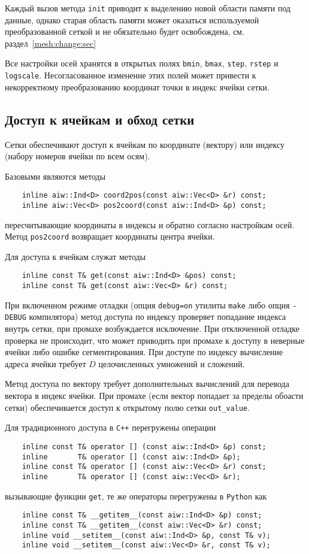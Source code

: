 Каждый вызов метода \verb'init' приводит к выделению новой области памяти под данные, однако старая область памяти
может оказаться используемой преобразованной сеткой и не обязательно будет освобождена, см. раздел~\ref{mesh:change:sec}

Все настройки осей хранятся в открытых полях \verb'bmin', \verb'bmax', \verb'step',
\verb'rstep' и \verb'logscale'. 
Несогласованное изменение этих полей может привести к некорректному преобразованию координат точки
в индекс ячейки сетки.

\subsection{Доступ к ячейкам и обход сетки}
Сетки обеспечивают доступ к ячейкам по координате (вектору) или индексу (набору номеров ячейки по всем осям).

Базовыми являются методы
\begin{verbatim}
    inline aiw::Ind<D> coord2pos(const aiw::Vec<D> &r) const;
    inline aiw::Vec<D> pos2coord(const aiw::Ind<D> &p) const;
\end{verbatim}
пересчитывающие координаты в индексы и обратно согласно настройкам осей. Метод \verb'pos2coord' возвращает координаты 
центра ячейки. 

Для доступа к ячейкам служат методы
\begin{verbatim}
    inline const T& get(const aiw::Ind<D> &pos) const;
    inline const T& get(const aiw::Vec<D> &r) const;
\end{verbatim}
При включенном режиме отладки (опция \verb'debug=on' утилиты \verb'make' либо опция \verb'-DEBUG' компилятора)
метод доступа по индексу проверяет попадание индекса внутрь сетки, при промахе возбуждается исключение.
При отключенной отладке проверка не происходит, что может приводить при промахе к доступу в неверные ячейки 
либо ошибке сегментирования. При доступе по индексу вычисление адреса ячейки требует $D$ целочисленных умножений и сложений.

Метод доступа по вектору требует дополнительных вычислений для перевода вектора в индекс ячейки. 
При промахе (если вектор попадает за пределы обоасти сетки) обеспечивается доступ к открытому полю сетки \verb'out_value'.

Для традиционного доступа в \verb'C++' перегружены операции 
\begin{verbatim}
    inline const T& operator [] (const aiw::Ind<D> &p) const;
    inline       T& operator [] (const aiw::Ind<D> &p);
    inline const T& operator [] (const aiw::Vec<D> &r) const;
    inline       T& operator [] (const aiw::Vec<D> &r);
\end{verbatim}
вызывающие функции \verb'get', те же операторы перегружены в \verb'Python' как
\begin{verbatim}
    inline const T& __getitem__(const aiw::Ind<D> &p) const;
    inline const T& __getitem__(const aiw::Vec<D> &r) const;
    inline void __setitem__(const aiw::Ind<D> &p, const T& v);
    inline void __setitem__(const aiw::Vec<D> &r, const T& v);
\end{verbatim}

